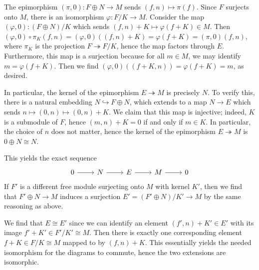 \documentclass[../../master.tex]{subfiles}
\begin{document}
\begin{solution}
    The epimorphism $(\pi, 0): F \oplus N \to M$ sends $(f, n) \mapsto \pi(f)$.
    Since $F$ surjects onto $M$, there is an isomorphism $\varphi: F/K \to M$.
    Consider the map $(\varphi, 0): (F \oplus N) / K$ which sends $(f, n) + K \mapsto \varphi(f + K) \in M$.
    Then $(\varphi, 0) \circ \pi_K(f, n) = (\varphi, 0)((f, n) + K) = \varphi(f + K) = (\pi, 0)(f, n)$, where $\pi_K$ is the projection $F \twoheadrightarrow F/K$, hence the map factors through $E$.
    Furthermore, this map is a surjection because for all $m \in M$, we may identify $m = \varphi(f + K)$.
    Then we find $(\varphi, 0)((f + K, n)) = \varphi(f + K) = m$, as desired.

    In particular, the kernel of the epimorphism $E \twoheadrightarrow M$ is precisely $N$.
    To verify this, there is a natural embedding $N \hookrightarrow F \oplus N$, which extends to a map $N \to E$ which sends $n \mapsto (0, n) \mapsto (0, n) + K$.
    We claim that this map is injective;
    indeed, $K$ is a submodule of $F$, hence $(m, n) + K = 0$ if and only if $m \in K$.
    In particular, the choice of $n$ does not matter, hence the kernel of the epimorphism $E \twoheadrightarrow M$ is $0 \oplus N \cong N$.

    This yields the exact sequence
    \[
    \begin{tikzcd}
        0 & N & E & M & 0
        \arrow[from=1-1, to=1-2]
        \arrow[from=1-2, to=1-3]
        \arrow[from=1-3, to=1-4]
        \arrow[from=1-4, to=1-5] 
    \end{tikzcd}
    \]
    If $F'$ is a different free module surjecting onto $M$ with kernel $K'$, then we find that $F' \oplus N \to M$ induces a surjection $E' = (F' \oplus N)/K' \to M$ by the same reasoning as above.

    We find that $E \cong E'$ since we can identify an element $(f', n) + K' \in E'$ with its image $f' + K' \in F'/K' \cong M$.
    Then there is exactly one corresponding element $f + K \in F/K \cong M$ mapped to by $(f, n) + K$.
    This essentially yields the needed isomorphism for the diagrams to commute, hence the two extensions are isomorphic.


\end{solution}
\end{document}
